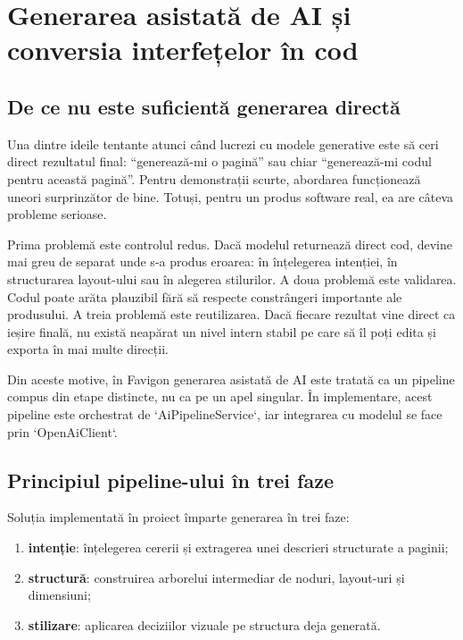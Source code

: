 \chapter{Generarea asistată de AI și conversia interfețelor în cod}

\section{De ce nu este suficientă generarea directă}

Una dintre ideile tentante atunci când lucrezi cu modele generative este să ceri direct rezultatul final: ``generează-mi o pagină'' sau chiar ``generează-mi codul pentru această pagină''. Pentru demonstrații scurte, abordarea funcționează uneori surprinzător de bine. Totuși, pentru un produs software real, ea are câteva probleme serioase.

Prima problemă este controlul redus. Dacă modelul returnează direct cod, devine mai greu de separat unde s-a produs eroarea: în înțelegerea intenției, în structurarea layout-ului sau în alegerea stilurilor. A doua problemă este validarea. Codul poate arăta plauzibil fără să respecte constrângeri importante ale produsului. A treia problemă este reutilizarea. Dacă fiecare rezultat vine direct ca ieșire finală, nu există neapărat un nivel intern stabil pe care să îl poți edita și exporta în mai multe direcții.

Din aceste motive, în Favigon generarea asistată de AI este tratată ca un pipeline compus din etape distincte, nu ca pe un apel singular. În implementare, acest pipeline este orchestrat de `AiPipelineService`, iar integrarea cu modelul se face prin `OpenAiClient`.

\section{Principiul pipeline-ului în trei faze}

Soluția implementată în proiect împarte generarea în trei faze:

\begin{enumerate}[leftmargin=1.5cm]
  \item \textbf{intenție}: înțelegerea cererii și extragerea unei descrieri structurate a paginii;
  \item \textbf{structură}: construirea arborelui intermediar de noduri, layout-uri și dimensiuni;
  \item \textbf{stilizare}: aplicarea deciziilor vizuale pe structura deja generată.
\end{enumerate}

